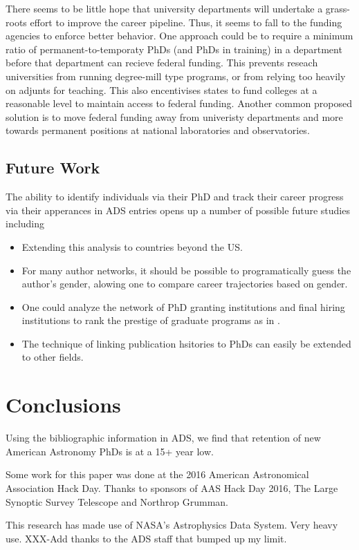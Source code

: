 \documentclass{emulateapj}
\begin{document}
There seems to be little hope that university departments will undertake a grass-roots effort to improve the career pipeline. Thus, it seems to fall to the funding agencies to enforce better behavior.  One approach could be to require a minimum ratio of permanent-to-temporaty PhDs (and PhDs in training) in a department before that department can recieve federal funding.  This prevents reseach universities from running degree-mill type programs, or from relying too heavily on adjunts for teaching.  This also encentivises states to fund colleges at a reasonable level to maintain access to federal funding.  Another common proposed solution is to move federal funding away from univeristy departments and more towards permanent positions at national laboratories and observatories.


\subsection{Future Work}

The ability to identify individuals via their PhD and track their career progress via their apperances in ADS entries opens up a number of possible future studies including
\begin{itemize}
\item{Extending this analysis to countries beyond the US.}
\item{For many author networks, it should be possible to programatically guess the author's gender, alowing one to compare career trajectories based on gender.}
\item{One could analyze the network of PhD granting institutions and final hiring institutions to rank the prestige of graduate programs as in \citet{Clausete15}.}
\item{The technique of linking publication hsitories to PhDs can easily be extended to other fields.}
\end{itemize}

\section{Conclusions}
Using the bibliographic information in ADS, we find that retention of new American Astronomy PhDs is at a 15+ year low.  


\acknowledgments
Some work for this paper was done at the 2016 American Astronomical Association Hack Day. Thanks to sponsors of AAS Hack Day 2016, The Large Synoptic Survey Telescope and Northrop Grumman.

This research has made use of NASA's Astrophysics Data System. Very heavy use. XXX-Add thanks to the ADS staff that bumped up my limit.


\end{document}
